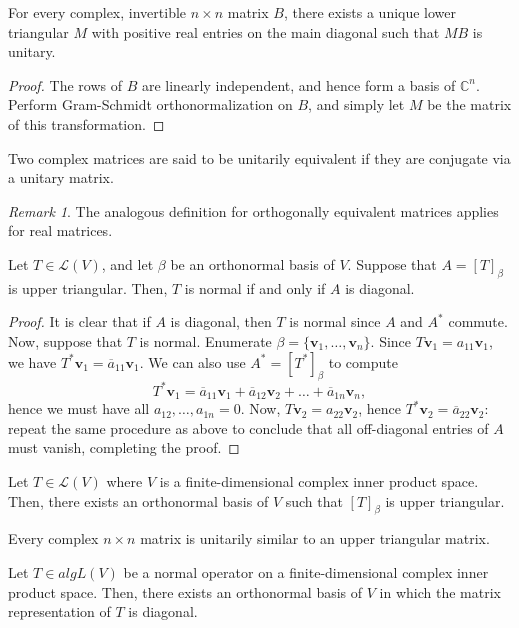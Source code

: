 \documentclass[11pt]{article}
\newcommand{\C}{\mathbb{C}}
\renewcommand{\vec}[1]{\boldsymbol{#1}}
\newcommand{\vv}{\vec{v}}
\newcommand{\alg}[1]{\mathscr{#1}}
\newcommand{\algL}{\alg{L}}
\theoremstyle{definition}
\theoremstyle{remark}
\newtheorem*{remark}{Remark}
\numberwithin{equation}{section}
\begin{document}
    \begin{theorem}
        For every complex, invertible $n \times n$ matrix $B$, there exists a unique
        lower triangular $M$ with positive real entries on the main diagonal such
        that $MB$ is unitary.
    \end{theorem}
    \begin{proof}
        The rows of $B$ are linearly independent, and hence form a basis of $\C^n$.
        Perform Gram-Schmidt orthonormalization on $B$, and simply let $M$ be the
        matrix of this transformation.
    \end{proof}


    \begin{definition}
        Two complex matrices are said to be unitarily equivalent if they are
        conjugate via a unitary matrix.
        \begin{remark}
            The analogous definition for orthogonally equivalent matrices applies
            for real matrices.
        \end{remark}
    \end{definition}

    \begin{theorem}
        Let $T\in \algL(V)$, and let $\beta$ be an orthonormal basis of $V$. Suppose
        that $A = [T]_\beta$ is upper triangular. Then, $T$ is normal if and only if
        $A$ is diagonal.
    \end{theorem}
    \begin{proof}
        It is clear that if $A$ is diagonal, then $T$ is normal since $A$ and $A^*$
        commute. Now, suppose that $T$ is normal. Enumerate $\beta = \{\vv_1, \dots,
        \vv_n\}$. Since $T\vv_1 = a_{11}\vv_1$, we have $T^*\vv_1 =
        \overline{a}_{11}\vv_1$. We can also use $A^* = [T^*]_\beta$ to compute \[
            T^*\vv_1 = \overline{a}_{11}\vv_1 + \overline{a}_{12}\vv_2 + \dots +
            \overline{a}_{1n}\vv_n,
        \] hence we must have all $a_{12}, \dots, a_{1n} = 0$. Now, $T\vv_2 =
        a_{22}\vv_2$, hence $T^*\vv_2 = \overline{a}_{22}\vv_2$: repeat the same
        procedure as above to conclude that all off-diagonal entries of $A$ must
        vanish, completing the proof.
    \end{proof}

    \begin{theorem}
        Let $T \in \algL(V)$ where $V$ is a finite-dimensional complex inner product
        space. Then, there exists an orthonormal basis of $V$ such that $[T]_\beta$
        is upper triangular.
    \end{theorem}
    \begin{corollary}
        Every complex $n\times n$ matrix is unitarily similar to an upper triangular
        matrix.
    \end{corollary}
    \begin{corollary}
        Let $T\in algL(V)$ be a normal operator on a finite-dimensional complex inner
        product space. Then, there exists an orthonormal basis of $V$ in which the
        matrix representation of $T$ is diagonal.
    \end{corollary}
\end{document}
